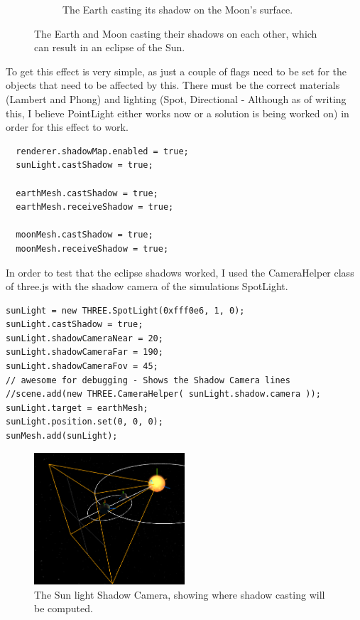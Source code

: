 \documentclass[12pt]{article}
\begin{document}
\begin{figure}[H]
\begin{subfigure}[b]{0.4\textwidth}
                \caption{The Earth casting its shadow on the Moon's surface.}
                \label{fig:The Earth casting its shadow on the Moon's surface.}
	 \end{subfigure}
	 \caption{The Earth and Moon casting their shadows on each other, which can result in an eclipse of the Sun.}
\end{figure}

To get this effect is very simple, as just a couple of flags need to be set for the objects that need to be affected by this. There must be the correct materials (Lambert and Phong) and lighting (Spot, Directional - Although as of writing this, I believe PointLight either works now or a solution is being worked on) in order for this effect to work.
\begin{lstlisting}
  renderer.shadowMap.enabled = true;
  sunLight.castShadow = true;
  
  earthMesh.castShadow = true;
  earthMesh.receiveShadow = true;
  
  moonMesh.castShadow = true;
  moonMesh.receiveShadow = true;
\end{lstlisting}

In order to test that the eclipse shadows worked, I used the CameraHelper class of three.js with the shadow camera of the simulations SpotLight.
\begin{lstlisting}
sunLight = new THREE.SpotLight(0xfff0e6, 1, 0);
sunLight.castShadow = true;
sunLight.shadowCameraNear = 20;
sunLight.shadowCameraFar = 190;
sunLight.shadowCameraFov = 45;
// awesome for debugging - Shows the Shadow Camera lines
//scene.add(new THREE.CameraHelper( sunLight.shadow.camera ));
sunLight.target = earthMesh;    
sunLight.position.set(0, 0, 0);
sunMesh.add(sunLight);
\end{lstlisting}

\begin{figure}[H]
        \centering
       
                \includegraphics[width=0.5\textwidth]{images/shadowcamera}
                \caption{The Sun light Shadow Camera, showing where shadow casting will be computed.}
                \label{fig: The Shadow Camera.}
      
\end{figure}
\end{document}
